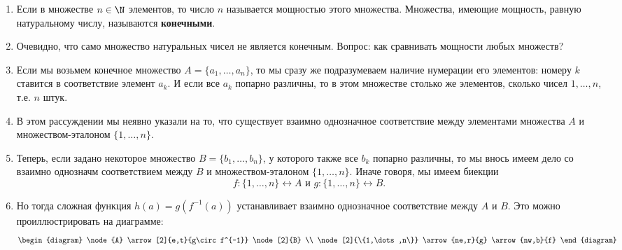 \begin{enumerate}
\item Если в множестве $n\in\N$ элементов, то число $n$ называется мощностью этого множества. Множества, имеющие мощность, равную натуральному числу, называются \textbf{конечными}.
\item Очевидно, что само множество натуральных чисел не является конечным. Вопрос: как сравнивать мощности любых множеств?
\item Если мы возьмем конечное множество $A=\{a_1,\dots,a_n\}$, то мы сразу же подразумеваем наличие нумерации его элементов: номеру $k$ ставится в соответствие элемент $a_k$. И если все $a_k$ попарно различны, то в этом множестве столько же элементов, сколько чисел $1,\dots,n$, т.е. $n$ штук.
\item В этом рассуждении мы неявно указали на то, что существует взаимно однозначное соответствие между элементами множества $A$ и множеством-эталоном $\{1,\dots, n\}$.
\item Теперь, если задано некоторое множество $B=\{b_1,\dots,b_n\}$, у которого также все $b_k$ попарно различны, то мы внось имеем дело со взаимно однозначм соответствием между $B$ и множеством-эталоном $\{1,\dots, n\}$. Иначе говоря, мы имеем биекции 
$$
f:\{1,\dots, n\}\leftrightarrow A\mbox{ и }g:\{1,\dots, n\}\leftrightarrow B.
$$
\item Но тогда сложная функция $h(a)=g(f^{-1}(a))$ устанавливает взаимно однозначное соответствие между $A$ и $B$. Это можно проиллюстрировать на диаграмме:
\[ \begin{diagram}
\node{A} \arrow[2]{e,t}{g\circ f^{-1}}
\node[2]{B} \\
\node[2]{\{1,\dots,n\}} \arrow{ne,r}{g}
\arrow{nw,b}{f}
\end{diagram}\]


\end{enumerate}
